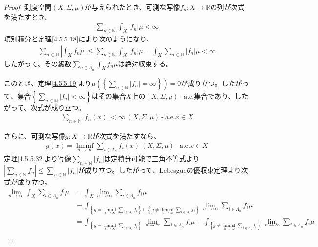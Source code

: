 \documentclass[dvipdfmx]{jsarticle}
\begin{document}
\begin{proof}
測度空間$(X,\varSigma,\mu)$が与えられたとき、可測な写像$f_{n}:X \rightarrow \mathbb{R}$の列が次式を満たすとき、
\begin{align*}
\sum_{n \in \mathbb{N}} {\int_{X} {\left| f_{n} \right|\mu}} < \infty
\end{align*}
項別積分と定理\ref{4.5.5.18}により次のようになり、
\begin{align*}
\sum_{n \in \mathbb{N}} \left| \int_{X} {f_{n}\mu} \right| \leq \sum_{n \in \mathbb{N}} {\int_{X} {\left| f_{n} \right|\mu}} = \int_{X} {\sum_{n \in \mathbb{N}} \left| f_{n} \right|\mu} < \infty
\end{align*}
したがって、その級数$\sum_{n \in \varLambda_{n}} {\int_{X} {f_{n}\mu}}$は絶対収束する。\par
このとき、定理\ref{4.5.5.19}より$\mu\left( \left\{ \sum_{n \in \mathbb{N}} \left| f_{n} \right| = \infty \right\} \right) = 0$が成り立つ。したがって、集合$\left\{ \sum_{n \in \mathbb{N}} \left| f_{n} \right| < \infty \right\}$はその集合$X$上の$(X,\varSigma,\mu) \ \text{-} \ \mathrm{a.e.}$集合であり、したがって、次式が成り立つ。
\begin{align*}
\sum_{n \in \mathbb{N}} \left| f_{n}(x) \right| < \infty\ (X,\varSigma,\mu) \ \text{-} \ \mathrm{a.e.}x \in X
\end{align*}\par
さらに、可測な写像$g:X \rightarrow \mathbb{R}$が次式を満たすなら、
\begin{align*}
g(x) = \liminf_{n \rightarrow \infty}{\sum_{i \in \varLambda_{n}} {f_{i}(x)}}\ (X,\varSigma,\mu) \ \text{-} \ \mathrm{a.e.}x \in X
\end{align*}
定理\ref{4.5.5.32}より写像$\sum_{n \in \mathbb{N}} \left| f_{n} \right|$は定積分可能で三角不等式より$\left| \sum_{n \in \mathbb{N}} f_{n} \right| \leq \sum_{n \in \mathbb{N}} \left| f_{n} \right|$が成り立つ。したがって、Lebesgueの優収束定理より次式が成り立つ。
\begin{align*}
\lim_{n \rightarrow \infty}{\int_{X} {\sum_{i \in \varLambda_{n}} f_{i}\mu}} &= \int_{X} {\lim_{n \rightarrow \infty}{\sum_{i \in \varLambda_{n}} f_{i}}\mu}\\
&= \int_{\left\{ g = \liminf_{n \rightarrow \infty}{\sum_{i \in \varLambda_{n}} f_{i}} \right\} \sqcup \left\{ g \neq \liminf_{n \rightarrow \infty}{\sum_{i \in \varLambda_{n}} f_{i}} \right\}} {\lim_{n \rightarrow \infty}{\sum_{i \in \varLambda_{n}} f_{i}}\mu}\\
&= \int_{\left\{ g = \liminf_{n \rightarrow \infty}{\sum_{i \in \varLambda_{n}} f_{i}} \right\}} {\lim_{n \rightarrow \infty}{\sum_{i \in \varLambda_{n}} f_{i}}\mu} + \int_{\left\{ g \neq \liminf_{n \rightarrow \infty}{\sum_{i \in \varLambda_{n}} f_{i}} \right\}} {\lim_{n \rightarrow \infty}{\sum_{i \in \varLambda_{n}} f_{i}}\mu}\\

\end{align*}
\end{proof}
\end{document}
